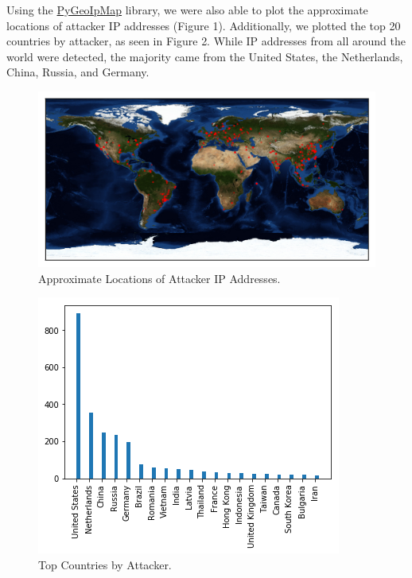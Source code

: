 Using the \href{https://github.com/pieqq/PyGeoIpMap}{PyGeoIpMap} library, we were also able to plot the approximate locations of attacker IP addresses (Figure 1). Additionally, we plotted the top 20 countries by attacker, as seen in Figure 2. While IP addresses from all around the world were detected, the majority came from the United States, the Netherlands, China, Russia, and Germany.

\begin{figure}[H]
	\includegraphics[width=\linewidth]{output.png}
	\caption{Approximate Locations of Attacker IP Addresses.}
	\label{fig:map}
\end{figure}


\begin{figure}
	\includegraphics[width=\linewidth]{countries.png}
	\caption{Top Countries by Attacker.}
	\label{fig:top-countries}
\end{figure}
